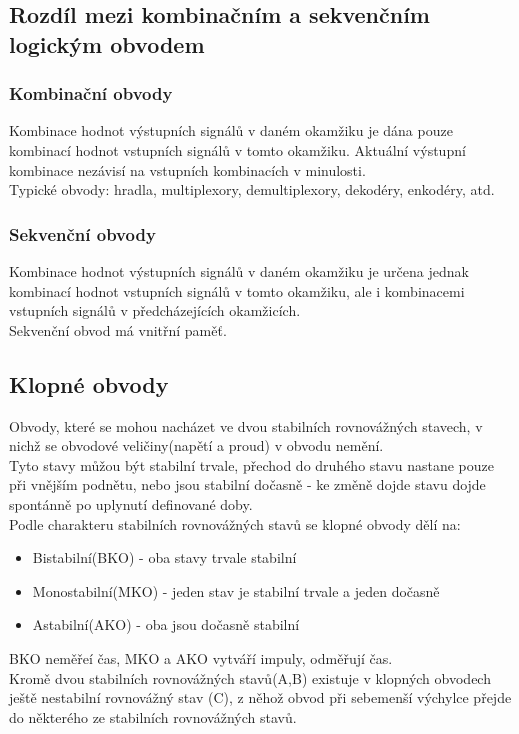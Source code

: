 \subsection{Rozdíl mezi kombinačním a sekvenčním logickým obvodem}
\subsubsection{Kombinační obvody}
Kombinace hodnot výstupních signálů v daném okamžiku je dána pouze kombinací hodnot vstupních signálů v tomto okamžiku. Aktuální výstupní kombinace nezávisí na vstupních kombinacích v minulosti.\\
Typické obvody: hradla, multiplexory, demultiplexory, dekodéry, enkodéry, atd.

\subsubsection{Sekvenční obvody}
Kombinace hodnot výstupních signálů v daném okamžiku je určena jednak kombinací hodnot vstupních signálů v tomto okamžiku, ale i kombinacemi vstupních signálů v předcházejících okamžicích.\\
Sekvenční obvod má vnitřní paměť.\\

\subsection{Klopné obvody}
Obvody, které se mohou nacházet ve dvou stabilních rovnovážných stavech, v nichž se obvodové veličiny(napětí a proud) v obvodu nemění.\\
Tyto stavy můžou být stabilní trvale, přechod do druhého stavu nastane pouze při vnějším podnětu, nebo jsou stabilní dočasně - ke změně dojde stavu dojde spontánně po uplynutí definované doby.\\
Podle charakteru stabilních rovnovážných stavů se klopné obvody dělí na:
\begin{itemize}
    \item Bistabilní(BKO) - oba stavy trvale stabilní
    \item Monostabilní(MKO) - jeden stav je stabilní trvale a jeden dočasně
    \item Astabilní(AKO) - oba jsou dočasně stabilní
\end{itemize}
BKO neměřeí čas, MKO a AKO vytváří impuly, odměřují čas.\\
Kromě dvou stabilních rovnovážných stavů(A,B) existuje v klopných obvodech ještě nestabilní rovnovážný stav (C), z něhož obvod při sebemenší výchylce přejde do některého ze stabilních rovnovážných stavů.\\
